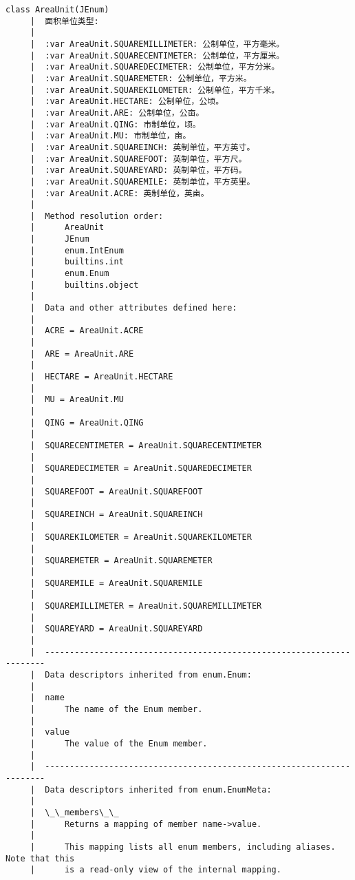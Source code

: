 \documentclass[11pt]{article}
\begin{document}
\begin{Verbatim}[commandchars=\\\{\}]
    class AreaUnit(JEnum)
     |  面积单位类型:
     |  
     |  :var AreaUnit.SQUAREMILLIMETER: 公制单位，平方毫米。
     |  :var AreaUnit.SQUARECENTIMETER: 公制单位，平方厘米。
     |  :var AreaUnit.SQUAREDECIMETER: 公制单位，平方分米。
     |  :var AreaUnit.SQUAREMETER: 公制单位，平方米。
     |  :var AreaUnit.SQUAREKILOMETER: 公制单位，平方千米。
     |  :var AreaUnit.HECTARE: 公制单位，公顷。
     |  :var AreaUnit.ARE: 公制单位，公亩。
     |  :var AreaUnit.QING: 市制单位，顷。
     |  :var AreaUnit.MU: 市制单位，亩。
     |  :var AreaUnit.SQUAREINCH: 英制单位，平方英寸。
     |  :var AreaUnit.SQUAREFOOT: 英制单位，平方尺。
     |  :var AreaUnit.SQUAREYARD: 英制单位，平方码。
     |  :var AreaUnit.SQUAREMILE: 英制单位，平方英里。
     |  :var AreaUnit.ACRE: 英制单位，英亩。
     |  
     |  Method resolution order:
     |      AreaUnit
     |      JEnum
     |      enum.IntEnum
     |      builtins.int
     |      enum.Enum
     |      builtins.object
     |  
     |  Data and other attributes defined here:
     |  
     |  ACRE = AreaUnit.ACRE
     |  
     |  ARE = AreaUnit.ARE
     |  
     |  HECTARE = AreaUnit.HECTARE
     |  
     |  MU = AreaUnit.MU
     |  
     |  QING = AreaUnit.QING
     |  
     |  SQUARECENTIMETER = AreaUnit.SQUARECENTIMETER
     |  
     |  SQUAREDECIMETER = AreaUnit.SQUAREDECIMETER
     |  
     |  SQUAREFOOT = AreaUnit.SQUAREFOOT
     |  
     |  SQUAREINCH = AreaUnit.SQUAREINCH
     |  
     |  SQUAREKILOMETER = AreaUnit.SQUAREKILOMETER
     |  
     |  SQUAREMETER = AreaUnit.SQUAREMETER
     |  
     |  SQUAREMILE = AreaUnit.SQUAREMILE
     |  
     |  SQUAREMILLIMETER = AreaUnit.SQUAREMILLIMETER
     |  
     |  SQUAREYARD = AreaUnit.SQUAREYARD
     |  
     |  ----------------------------------------------------------------------
     |  Data descriptors inherited from enum.Enum:
     |  
     |  name
     |      The name of the Enum member.
     |  
     |  value
     |      The value of the Enum member.
     |  
     |  ----------------------------------------------------------------------
     |  Data descriptors inherited from enum.EnumMeta:
     |  
     |  \_\_members\_\_
     |      Returns a mapping of member name->value.
     |      
     |      This mapping lists all enum members, including aliases. Note that this
     |      is a read-only view of the internal mapping.
    

\end{Verbatim}
\end{document}
